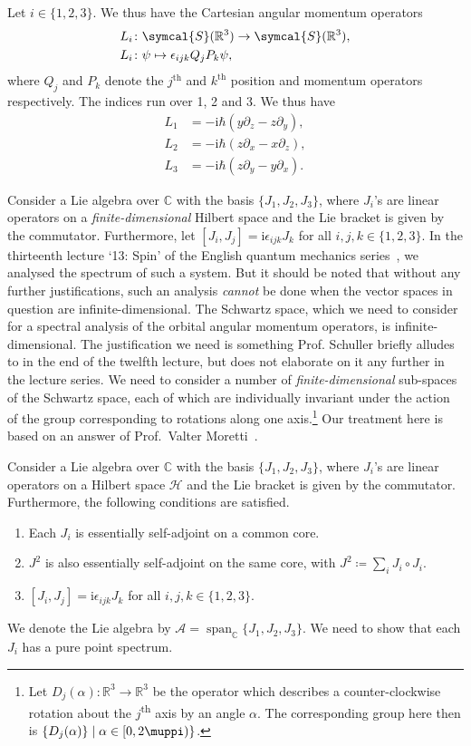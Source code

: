 \documentclass[12pt, a4 paper]{article}
\theoremstyle{definition}
\newcommand{\position}{Q}
\newcommand{\momentum}{P}
\newcommand{\rthree}{\mathbb{R}^3}
\newcommand{\rr}{\mathbb{R}}
\newcommand{\cc}{\mathbb{C}}
\newcommand{\hilbert}{\mathcal{H}}
\newcommand{\schwartz}{\symcal{S}}
\newcommand{\schwartzrthree}{\schwartz(\rr^3)}
\renewcommand{\i}{\mathrm{i}}
\renewcommand{\pi}{\muppi}
\newcommand{\levi}{\epsilon_{ijk}}
\DeclareMathOperator{\spann}{span}
\begin{document}
	Let $i \in \{1,2,3\}$. We thus have the Cartesian angular momentum operators
	\begin{align*}
		L_i &\colon \schwartzrthree \rightarrow \schwartzrthree,\\
		L_i &\colon \psi \mapsto \levi\position_j\momentum_k\psi,
	\end{align*}
	where $\position_j$ and $\momentum_k$ denote the $j^\text{th}$ and $k^\text{th}$ position and momentum operators respectively. The indices run over 1, 2 and 3.
	We thus have
	\begin{align*}
		L_1 &= -\i\hbar(y\partial_z - z\partial_y),\\
		L_2 &= -\i\hbar(z\partial_x - x\partial_z),\\
		L_3 &= -\i\hbar(z\partial_y - y\partial_x).
	\end{align*}

	Consider a Lie algebra over \(\cc\) with the basis \(\{J_1, J_2, J_3\}\), where \(J_i\)'s are linear operators on a \textit{finite-dimensional} Hilbert space and the Lie bracket is given by the commutator. Furthermore, let \([J_i, J_j] = \i \epsilon_{ijk} J_k\) for all \(i, j, k \in \{1, 2, 3\}\). In the thirteenth lecture `13: Spin' of the English quantum mechanics series~\cite{Schuller, SchullerVideos}, we analysed the spectrum of such a system. But it should be noted that without any further justifications, such an analysis \textit{cannot} be done when the vector spaces in question are infinite-dimensional. The Schwartz space, which we need to consider for a spectral analysis of the orbital angular momentum operators, is infinite-dimensional. The justification we need is something Prof. Schuller briefly alludes to in the end of the twelfth lecture, but does not elaborate on it any further in the lecture series. We need to consider a number of \textit{finite-dimensional} sub-spaces of the Schwartz space, each of which are individually invariant under the action of the group corresponding to rotations along one axis.\footnote{Let \(D_j(\alpha) \colon \rthree \rightarrow \rthree\) be the operator which describes a counter-clockwise rotation about the \(j\)\textsuperscript{th} axis by an angle \(\alpha\). The corresponding group here then is \(\{D_j(\alpha)\} \mid \alpha \in [0, 2\pi)\}\).} Our treatment here is based on an answer of Prof.\ Valter Moretti~\cite{MorettiPeter}.

	Consider a Lie algebra over \(\cc\) with the basis \(\{J_1, J_2, J_3\}\), where \(J_i\)'s are linear operators on a Hilbert space \(\hilbert\) and the Lie bracket is given by the commutator. Furthermore, the following conditions are satisfied.
	\begin{enumerate}
		\item Each \(J_i\) is essentially self-adjoint on a common core.
		\item \(J^2\) is also essentially self-adjoint on the same core, with \(J^2 \coloneq \sum_i J_i \circ J_i\).
		\item \([J_i, J_j] = \i \epsilon_{ijk} J_k\) for all \(i, j, k \in \{1, 2, 3\}\).
	\end{enumerate}
	We denote the Lie algebra by \(\mathcal{A} = \spann_{\cc}\{J_1, J_2, J_3\}\). We need to show that each \(J_i\) has a pure point spectrum.
\end{document}
